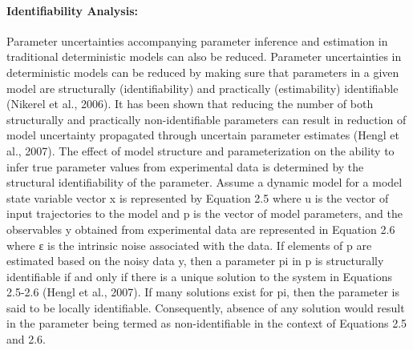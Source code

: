\documentclass[10pt]{report}
\begin{document}
\paragraph{Identifiability Analysis:}
Parameter uncertainties accompanying parameter inference and estimation in traditional deterministic models can also be reduced. Parameter uncertainties in deterministic models can be reduced by making sure that parameters in a given model are structurally (identifiability) and practically (estimability) identifiable (Nikerel et al., 2006). It has been shown that reducing the number of both structurally and practically non-identifiable parameters can result in reduction of model uncertainty propagated through uncertain parameter estimates (Hengl et al., 2007).
The effect of model structure and parameterization on the ability to infer true parameter values from experimental data is determined by the structural identifiability of the parameter. Assume a dynamic model for a model state variable vector x is represented by Equation 2.5 where u is the vector of input trajectories to the model and p is the vector of model parameters, and the observables y obtained from experimental data are represented in Equation 2.6 where ε is the intrinsic noise associated with the data. If elements of p are estimated based on the noisy data y, then a parameter pi in p is structurally identifiable if and only if there is a unique solution to the system in Equations 2.5-2.6 (Hengl et al., 2007). If many solutions exist for pi, then the parameter is said to be locally identifiable. Consequently, absence of any solution would result in the parameter being termed as non-identifiable in the context of Equations 2.5 and 2.6. 
\end{document}
